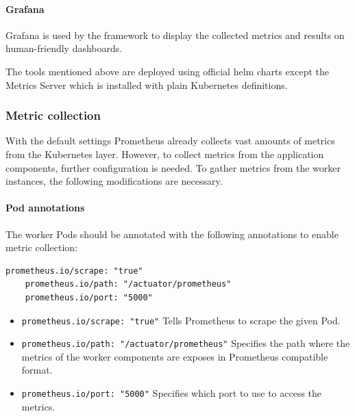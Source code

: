 \paragraph{Grafana} Grafana is used by the framework to display the collected metrics and results on human-friendly dashboards.

The tools mentioned above are deployed using official helm charts \cite{PrometheusChart} \cite{PrometheusAdapterChart} \cite{BlackboxExporterChart} \cite{GrafanaChart} except the Metrics Server which is installed with plain Kubernetes definitions. 

\subsubsection{Metric collection}


With the default settings Prometheus already collects vast amounts of metrics from the Kubernetes layer. However, to collect metrics from the application components, further configuration is needed. To gather metrics from the worker instances, the following modifications are necessary.

\paragraph{Pod annotations} The worker Pods should be annotated with the following annotations to enable metric collection:

\vspace{0.5cm}
\begin{minipage}{\linewidth}
	\begin{lstlisting}[caption={Worker annotation to enable monitoring}, label={lst:worker-annotation-monitoring}]
	prometheus.io/scrape: "true"
	prometheus.io/path: "/actuator/prometheus"
	prometheus.io/port: "5000"
	\end{lstlisting}
\end{minipage}

\begin{itemize}
	\item \texttt{prometheus.io/scrape: "true"} Tells Prometheus to scrape the given Pod.
	\item \texttt{prometheus.io/path: "/actuator/prometheus"} Specifies the path where the metrics of the worker components are exposes in Prometheus compatible format.
	\item \texttt{prometheus.io/port: "5000"} Specifies which port to use to access the metrics.
\end{itemize}

